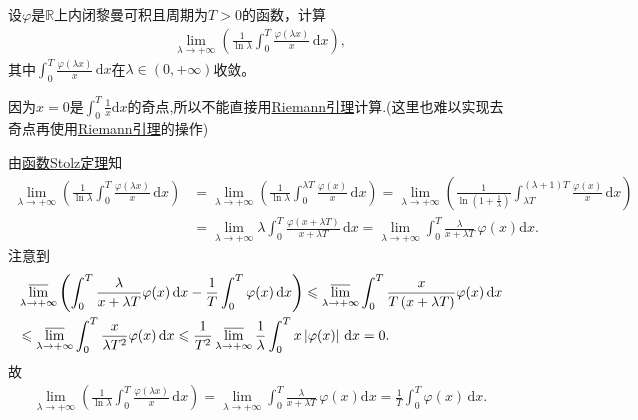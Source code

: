 \documentclass[../../main.tex]{subfiles}%
\begin{document}
\begin{example}
设\(\varphi\)是\(\mathbb{R}\)上内闭黎曼可积且周期为\(T > 0\)的函数，计算
\begin{align*}
\lim_{\lambda \to +\infty} \left( \frac{1}{\ln \lambda} \int_0^T \frac{\varphi(\lambda x)}{x} \, \mathrm{d}x \right),
\end{align*}
其中\(\int_0^T \frac{\varphi(\lambda x)}{x} \, \mathrm{d}x\)在\(\lambda \in (0, +\infty)\)收敛。
\end{example}
\begin{remark}
因为$x=0$是$\int_0^T{\frac{1}{x}\mathrm{d}x}$的奇点,所以不能直接用\hyperref[theorem:Riemann引理]{Riemann引理}计算.(这里也难以实现去奇点再使用\hyperref[theorem:Riemann引理]{Riemann引理}的操作)
\end{remark}
\begin{solution}

由\hyperref[theorem:函数Stolz定理]{函数Stolz定理}知
\begin{align*}
\lim_{\lambda \rightarrow +\infty} \left( \frac{1}{\ln \lambda}\int_0^T{\frac{\varphi (\lambda x)}{x}\,\mathrm{d}x} \right) &=\lim_{\lambda \rightarrow +\infty} \left( \frac{1}{\ln \lambda}\int_0^{\lambda T}{\frac{\varphi (x)}{x}\,\mathrm{d}x} \right) =\lim_{\lambda \rightarrow +\infty} \left( \frac{1}{\ln \left( 1+\frac{1}{\lambda} \right)}\int_{\lambda T}^{\left( \lambda +1 \right) T}{\frac{\varphi (x)}{x}\,\mathrm{d}x} \right) \\
&=\lim_{\lambda \rightarrow +\infty} \lambda \int_0^T{\frac{\varphi (x+\lambda T)}{x+\lambda T}\,\mathrm{d}x} =\lim_{\lambda \rightarrow +\infty} \int_0^T{\frac{\lambda}{x+\lambda T}\,\varphi (x)\mathrm{d}x}.
\end{align*}
注意到
\begin{align*}
&\varlimsup_{\lambda \rightarrow +\infty}\left( \int_0^T{\frac{\lambda}{x+\lambda T}\varphi (x)\,\mathrm{d}x}-\frac{1}{T}\int_0^T{\varphi (x)\,\mathrm{d}x} \right) \leqslant \varlimsup_{\lambda \rightarrow +\infty}\int_0^T{\frac{x}{T\left( x+\lambda T \right)}\varphi (x)\,\mathrm{d}x} \\
&\leqslant \varlimsup_{\lambda \rightarrow +\infty}\int_0^T{\frac{x}{\lambda T^2}\varphi (x)\,\mathrm{d}x} \leqslant \frac{1}{T^2}\varlimsup_{\lambda \rightarrow +\infty}\frac{1}{\lambda}\int_0^T{x\left| \varphi (x) \right|\,\mathrm{d}x}=0.
\end{align*}
故
\begin{align*}
\lim_{\lambda \rightarrow +\infty} \left( \frac{1}{\ln \lambda}\int_0^T{\frac{\varphi (\lambda x)}{x}\,\mathrm{d}x} \right) =\lim_{\lambda \rightarrow +\infty} \int_0^T{\frac{\lambda}{x+\lambda T}\,\varphi (x)\mathrm{d}x}=\frac{1}{T}\int_0^T{\varphi (x)\,\mathrm{d}x}.
\end{align*}
\end{solution}
\end{document}
